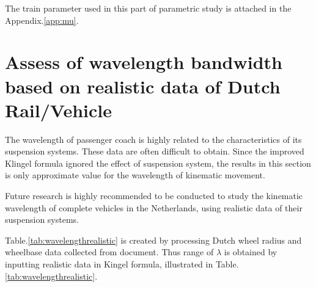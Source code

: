 The train parameter used in this part of parametric study is attached in the Appendix.\ref{app:mu}. 


\section{Assess of wavelength bandwidth based on realistic data of Dutch Rail/Vehicle}

The wavelength of passenger coach is highly related to the characteristics of its suspension systems. These data are often difficult to obtain. Since the improved Klingel formula ignored the effect of suspension system, the results in this section is only approximate value for the wavelength of kinematic movement.


Future research is highly recommended to be conducted to study the kinematic wavelength of complete vehicles in the Netherlands, using realistic data of their suspension systems.


Table.\ref{tab:wavelengthrealistic} is created by processing Dutch wheel radius and wheelbase data collected from document\citet{trainparameters}. 
Thus range of $\lambda$ is obtained by inputting realistic data in Kingel formula, illustrated in Table.\ref{tab:wavelengthrealistic}.

